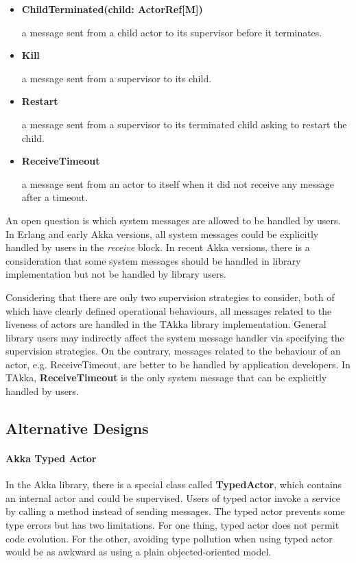 \begin{itemize}
  \item {\bf ChildTerminated(child: ActorRef[M])}  

  a message sent from a child actor to its supervisor before it terminates.

  \item {\bf Kill}

  a message sent from a supervisor to its child.

  \item {\bf Restart}
 
  a message sent from a supervisor to its terminated child asking to restart the child.

  \item {\bf ReceiveTimeout}

  a message sent from an actor to itself when it did not receive any message after a timeout.

\end{itemize}

An open question is which system messages are allowed to be handled by users.
In Erlang and early Akka versions, all system messages could be explicitly
handled by users in the {\it receive} block.  In recent Akka versions, there is
a consideration that some system messages should be handled in library
implementation but not be handled by library users.

Considering that there are only two supervision strategies to consider, both of
which have clearly defined operational behaviours, all messages related to the
liveness of actors are handled in the TAkka library implementation.  General
library users may indirectly affect the system message handler via specifying
the supervision strategies.  On the contrary, messages related to the behaviour
of an actor, e.g. ReceiveTimeout, are better to be handled by application
developers.  In TAkka, {\bf ReceiveTimeout} is the only system message that can
be explicitly handled by users.

\subsection{Alternative Designs}
\label{alternative designs}


\paragraph{Akka Typed Actor}
In the Akka library, there is a special class called {\bf TypedActor}, which
contains an internal actor and could be supervised.  Users of typed actor invoke
a service by calling a method instead of sending messages.  The typed actor
prevents some type errors but has two limitations.  For one thing, typed actor
does not permit code evolution.  For the other, avoiding type pollution when
using typed actor would be as awkward as using a plain objected-oriented model.

